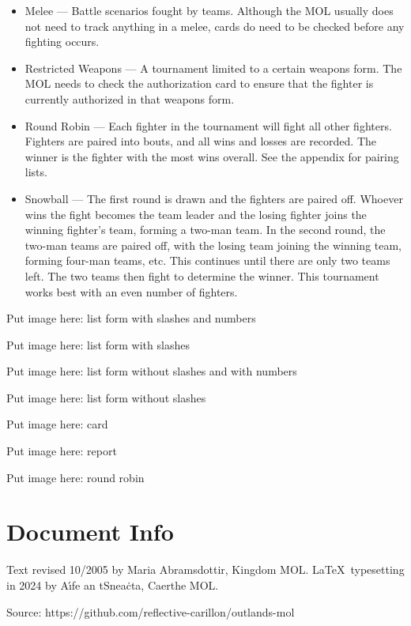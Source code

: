 \documentclass{article}
\begin{document}
\begin{itemize}
\item Melee --- Battle scenarios fought by teams. Although the MOL usually does not need to track anything
in a melee, cards do need to be checked before any fighting occurs.

\item Restricted Weapons --- A tournament limited to a certain weapons form. The MOL needs to check the
authorization card to ensure that the fighter is currently authorized in that weapons form.

\item Round Robin --- Each fighter in the tournament will fight all other fighters. Fighters are paired into
bouts, and all wins and losses are recorded. The winner is the fighter with the most wins overall. See
the appendix for pairing lists.

\item Snowball --- The first round is drawn and the fighters are paired off. Whoever wins the fight becomes
the team leader and the losing fighter joins the winning fighter’s team, forming a two-man team. In the
second round, the two-man teams are paired off, with the losing team joining the winning team,
forming four-man teams, etc. This continues until there are only two teams left. The two teams then
fight to determine the winner. This tournament works best with an even number of fighters.
\end{itemize}

Put image here: list form with slashes and numbers

Put image here: list form with slashes


Put image here: list form without slashes and with numbers

Put image here: list form without slashes

Put image here: card

Put image here: report

Put image here: round robin

\section{Document Info}

Text revised 10/2005 by Maria Abramsdottir, Kingdom MOL\@. \LaTeX\ typesetting in 2024 by A\'\i fe an tSnea\.cta, Caerthe MOL\@.

Source: https://github.com/reflective-carillon/outlands-mol
\end{document}

